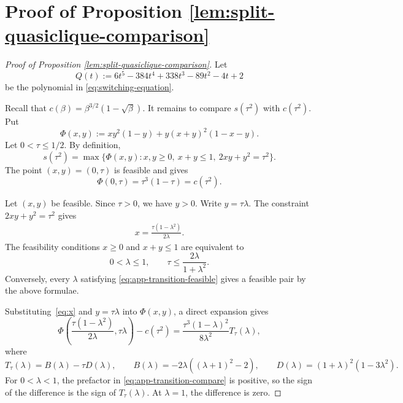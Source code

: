 \documentclass[10pt,a4paper]{article}
\begin{document}
\appendix
\section{Proof of Proposition \ref{lem:split-quasiclique-comparison}}
\begin{proof}[Proof of Proposition \ref{lem:split-quasiclique-comparison}]

 Let
 \[
 Q(t):=6t^5-384t^4+338t^3-89t^2-4t+2
 \]
 be the polynomial in \eqref{eq:switching-equation}. %


Recall that $c(\beta)=\beta^{3/2}(1-\sqrt{\beta})$. It remains to compare \(s(\tau^2)\) with \(c(\tau^2)\). Put
\[
\Phi(x,y):=xy^2(1-y)+y(x+y)^2(1-x-y).
\]
Let \(0<\tau\le 1/2\). By definition,
\[
s(\tau^2)
=
\max\{\Phi(x,y): x,y\ge0,\ x+y\le1,\ 2xy+y^2=\tau^2\}.
\]
The point \((x,y)=(0,\tau)\) is feasible and gives
\[
\Phi(0,\tau)=\tau^3(1-\tau)=c(\tau^2).
\]


Let \((x,y)\) be feasible. Since \(\tau>0\), we have \(y>0\). Write
$y=\tau\lambda $. The constraint \(2xy+y^2=\tau^2\) gives
\begin{align}\label{eq:x}
x=\frac{\tau(1-\lambda^2)}{2\lambda}.
\end{align}
The feasibility conditions \(x\ge0\) and \(x+y\le1\) are equivalent to
\begin{equation}\label{eq:app-transition-feasible}
0<\lambda\le1,
\qquad
\tau\le \frac{2\lambda}{1+\lambda^2}.
\end{equation}
Conversely, every \(\lambda\) satisfying
\eqref{eq:app-transition-feasible} gives a feasible pair by the above
formulae.


Substituting~\eqref{eq:x} and $y=\tau\lambda$
into \(\Phi(x,y)\), a direct expansion gives
\begin{equation}\label{eq:app-transition-compare}
\Phi\left(\frac{\tau(1-\lambda^2)}{2\lambda},\tau\lambda\right)
-
c(\tau^2)
=
\frac{\tau^3(1-\lambda)^2}{8\lambda^2}T_\tau(\lambda),
\end{equation}
where
\[
T_\tau(\lambda)=B(\lambda)-\tau D(\lambda),
\qquad
B(\lambda)=-2\lambda((\lambda+1)^2-2),
\qquad
D(\lambda)=(1+\lambda)^2(1-3\lambda^2).
\]
For \(0<\lambda<1\), the prefactor in
\eqref{eq:app-transition-compare} is positive, so the sign of the difference
is the sign of \(T_\tau(\lambda)\). At \(\lambda=1\), the difference is zero.



\end{proof}
\end{document}
